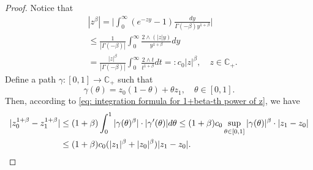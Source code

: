 \documentclass[12pt, a4paper]{amsart}
\theoremstyle{definition}
\numberwithin{equation}{section}
\begin{document}
\begin{proof}
    Notice that
\begin{align}
\label{eq: upper bound for beta power of z}
    &|z^{\beta}|
    = \Big|\int_0^\infty (e^{-zy}-1) \frac{dy}{\Gamma(-\beta)y^{1+\beta}}\Big| 
    \\&\leq \frac{1}{|\Gamma(-\beta)|}\int_0^\infty \frac{2\wedge (|z|y)}{y^{1+\beta}}dy
    \\&= \frac{|z|^{\beta}}{|\Gamma(-\beta)|}\int_0^\infty \frac{2\wedge t}{t^{1+\beta}}dt =: c_0 |z|^{\beta},
    \quad z\in \mathbb C_+.
\end{align}
    Define a path $\gamma: [0,1] \to \mathbb C_+$ such that
\[
    \gamma(\theta) 
    = z_0 (1-\theta) + \theta z_1,
    \quad \theta \in [0,1].
\]
    Then, according to \eqref{eq: integration formula for 1+beta-th power of z}, we have
\begin{align}
    |z_0^{1+\beta} - z_1^{1+\beta}| 
    &\leq (1+\beta) \int_0^1 |\gamma(\theta)^{\beta}|\cdot |\gamma'(\theta)|d\theta
    \leq (1+\beta) c_0 \sup_{\theta \in [0,1]} |\gamma(\theta)|^{\beta} \cdot |z_1-z_0|
    \\&\leq (1+\beta) c_0 ( |z_1|^{\beta}+|z_0|^{\beta} ) |z_1-z_0|.
    \qedhere
\end{align}
\end{proof}
    
\end{document}
